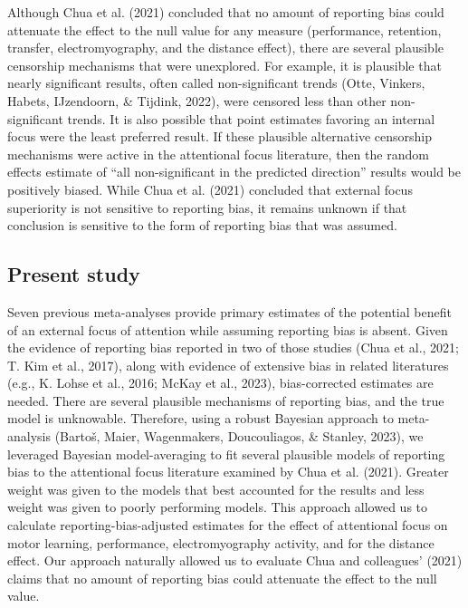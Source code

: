 \documentclass[
  man, donotrepeattitle,floatsintext]{apa7}
\begin{document}
Although Chua et al. (2021) concluded that no amount of reporting bias could attenuate the effect to the null value for any measure (performance, retention, transfer, electromyography, and the distance effect), there are several plausible censorship mechanisms that were unexplored. For example, it is plausible that nearly significant results, often called non-significant trends (Otte, Vinkers, Habets, IJzendoorn, \& Tijdink, 2022), were censored less than other non-significant trends. It is also possible that point estimates favoring an internal focus were the least preferred result. If these plausible alternative censorship mechanisms were active in the attentional focus literature, then the random effects estimate of ``all non-significant in the predicted direction'' results would be positively biased. While Chua et al. (2021) concluded that external focus superiority is not sensitive to reporting bias, it remains unknown if that conclusion is sensitive to the form of reporting bias that was assumed.

\hypertarget{present-study}{%
\subsection{Present study}\label{present-study}}

Seven previous meta-analyses provide primary estimates of the potential benefit of an external focus of attention while assuming reporting bias is absent. Given the evidence of reporting bias reported in two of those studies (Chua et al., 2021; T. Kim et al., 2017), along with evidence of extensive bias in related literatures (e.g., K. Lohse et al., 2016; McKay et al., 2023), bias-corrected estimates are needed. There are several plausible mechanisms of reporting bias, and the true model is unknowable. Therefore, using a robust Bayesian approach to meta-analysis (Bartoš, Maier, Wagenmakers, Doucouliagos, \& Stanley, 2023), we leveraged Bayesian model-averaging to fit several plausible models of reporting bias to the attentional focus literature examined by Chua et al. (2021). Greater weight was given to the models that best accounted for the results and less weight was given to poorly performing models. This approach allowed us to calculate reporting-bias-adjusted estimates for the effect of attentional focus on motor learning, performance, electromyography activity, and for the distance effect. Our approach naturally allowed us to evaluate Chua and colleagues' (2021) claims that no amount of reporting bias could attenuate the effect to the null value.
\end{document}

